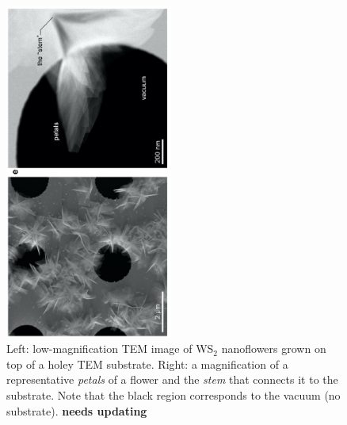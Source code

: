 \begin{figure}[t]
    \centering
    \includegraphics[width=0.49\textwidth,angle=-90]{plots/nanoflowers.pdf}
    \caption{Left: low-magnification TEM image of WS$_2$ nanoflowers
      grown on top of a holey TEM substrate. Right: a magnification of a
      representative {\it petals}
      of a flower and the {\it stem} that connects it to the substrate.
      Note that the black region corresponds to the vacuum (no substrate).
      {\bf needs updating}
      }
    \label{fig:nanoflowers}
\end{figure}

